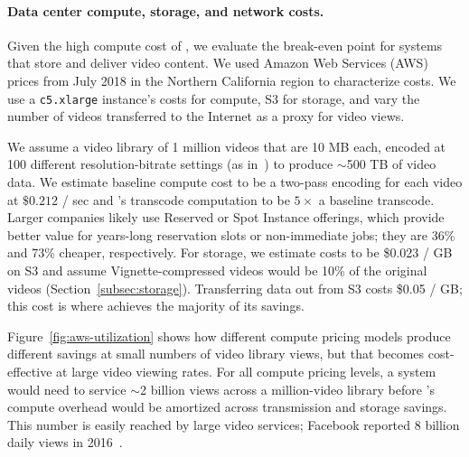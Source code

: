 \paragraph{Data center compute, storage, and network costs. }
Given the high compute cost of \name, we evaluate the break-even point for systems that store and deliver video content.
We used Amazon Web Services (AWS) prices from July 2018 in the Northern California region to characterize costs.
We use a \texttt{c5.xlarge} instance's costs for compute, S3 for storage, and vary the number of videos transferred to the Internet as a proxy for video views.

\awsBreakevenFigure


We assume a video library of 1 million videos that are 10 MB each, encoded at 100 different resolution-bitrate settings (as in~\cite{huang2017sve,netflix2018dynamicopt}) to produce $\sim$500 TB of video data.
We estimate baseline compute cost to be a two-pass encoding for each video at $\$0.212$ / sec and \name's transcode computation to be $5\times$ a baseline transcode.
Larger companies likely use Reserved or Spot Instance offerings, which provide better value for years-long reservation slots or non-immediate jobs; they are 36\% and 73\% cheaper, respectively.
For storage, we estimate costs to be \$0.023 / GB on S3 and assume Vignette-compressed videos would be 10\% of the original videos (Section~\ref{subsec:storage}).
Transferring data out from S3 costs \$0.05 / GB; this cost is where \name achieves the majority of its savings.



Figure~\ref{fig:aws-utilization} shows how different compute pricing models produce different savings at small numbers of video library views, but that \name becomes cost-effective at large video viewing rates.
For all compute pricing levels, a system would need to service $\sim$2 billion views across a million-video library before \name's compute overhead would be amortized across transmission and storage savings.
This number is easily reached by large video services; Facebook reported 8 billion daily views in 2016~\cite{fbviews}.

\powerFigure

